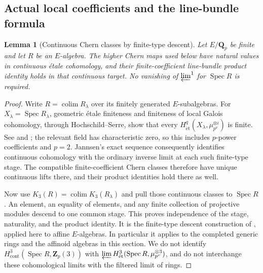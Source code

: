 \documentclass[11pt,a4paper]{article}
\newtheorem{lemma}[theorem]{Lemma}
\theoremstyle{remark}
\newcommand{\Q}{\mathbf Q}
\newcommand{\Z}{\mathbf Z}
\newcommand{\Spec}{\operatorname{Spec}}
\newcommand{\colim}{\operatorname*{colim}}
\begin{document}
\subsection{Actual local coefficients and the line-bundle formula}

\begin{lemma}[Continuous Chern classes by finite-type descent]\label{lem:continuouschern}
Let $E/\Q_p$ be finite and let $R$ be an $E$-algebra. The higher Chern maps used below have natural values in continuous \'etale cohomology, and their finite-coefficient line-bundle product identity holds in that continuous target. No vanishing of $\varprojlim^1$ for $\Spec R$ is required.
\end{lemma}
\begin{proof}
Write $R=\colim R_\lambda$ over its finitely generated $E$-subalgebras. For $X_\lambda=\Spec R_\lambda$, geometric \'etale finiteness and finiteness of local Galois cohomology, through Hochschild--Serre, show that every
$H^q_{\mathrm{\acute et}}(X_\lambda,\mu_{p^\nu}^{\otimes i})$ is finite. See \cite[Theorem~19.1(b)]{MilneEtale} and \cite[Chapter~I, Corollary~2.3]{MilneDuality}; the relevant field has characteristic zero, so this includes $p$-power coefficients and $p=2$. Jannsen's exact sequence \cite[equation~(0.2)]{Jannsen} consequently identifies continuous cohomology with the ordinary inverse limit at each such finite-type stage. The compatible finite-coefficient Chern classes therefore have unique continuous lifts there, and their product identities hold there as well.

Now use $K_3(R)=\colim K_3(R_\lambda)$ and pull those continuous classes to $\Spec R$. An element, an equality of elements, and any finite collection of projective modules descend to one common stage. This proves independence of the stage, naturality, and the product identity. It is the finite-type descent construction of \cite[Section~5.1]{LevineIndK3}, applied here to affine $E$-algebras. In particular it applies to the completed generic rings and the affinoid algebras in this section. We do not identify $H^3_{\mathrm{cont}}(\Spec R,\Z_p(3))$ with $\varprojlim H^3_{\mathrm{\acute et}}(\Spec R,\mu_{p^\nu}^{\otimes3})$, and do not interchange these cohomological limits with the filtered limit of rings.
\end{proof}
\end{document}
